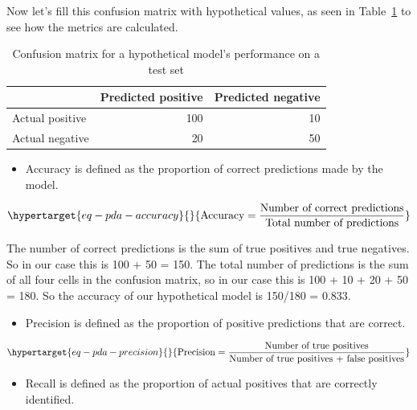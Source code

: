 \documentclass[
  letterpaper,
]{latex/krantz}
\providecommand{\tightlist}{%
  \setlength{\itemsep}{0pt}\setlength{\parskip}{0pt}}\usepackage{longtable,booktabs,array}
\begin{document}
Now let's fill this confusion matrix with hypothetical values, as seen
in Table~\ref{tbl-pda-confusion-matrix-example} to see how the metrics
are calculated.

\hypertarget{tbl-pda-confusion-matrix-example}{}
\begin{table}
\caption{\label{tbl-pda-confusion-matrix-example}Confusion matrix for a hypothetical model's performance on a test set }\tabularnewline

\centering
\begin{tabular}{l|r|r}
\hline
  & Predicted positive & Predicted negative\\
\hline
Actual positive & 100 & 10\\
\hline
Actual negative & 20 & 50\\
\hline
\end{tabular}
\end{table}

\begin{itemize}
\tightlist
\item
  Accuracy is defined as the proportion of correct predictions made by
  the model.
\end{itemize}

\begin{equation}\protect\hypertarget{eq-pda-accuracy}{}{
\text{Accuracy} = \frac{\text{Number of correct predictions}}{\text{Total number of predictions}}
}\label{eq-pda-accuracy}\end{equation}

The number of correct predictions is the sum of true positives and true
negatives. So in our case this is 100 + 50 = 150. The total number of
predictions is the sum of all four cells in the confusion matrix, so in
our case this is 100 + 10 + 20 + 50 = 180. So the accuracy of our
hypothetical model is 150/180 = 0.833.

\begin{itemize}
\tightlist
\item
  Precision is defined as the proportion of positive predictions that
  are correct.
\end{itemize}

\begin{equation}\protect\hypertarget{eq-pda-precision}{}{
\text{Precision} = \frac{\text{Number of true positives}}{\text{Number of true positives + false positives}}
}\label{eq-pda-precision}\end{equation}

\begin{itemize}
\tightlist
\item
  Recall is defined as the proportion of actual positives that are
  correctly identified.
\end{itemize}
\end{document}
